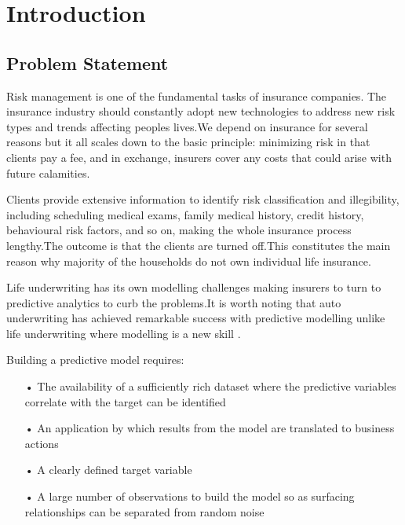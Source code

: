 \chapter{Introduction}

\section{Problem Statement}






Risk management is one of the fundamental tasks of insurance companies. The insurance industry should constantly adopt new technologies to address new risk types and trends affecting peoples lives.We depend on insurance for several reasons but it all scales down to the basic principle: minimizing risk in that clients pay a fee, and in exchange, insurers cover any costs that could arise with future calamities.

Clients provide extensive information to identify risk classification and illegibility, including scheduling medical exams, family medical history, credit history, behavioural risk factors, and so on, making the whole insurance process lengthy.The outcome is that the clients are turned off.This constitutes the main reason why majority of the households do not own individual life insurance.

Life underwriting has its own modelling challenges making insurers to turn to predictive  analytics to curb the problems.It is worth noting that auto underwriting has achieved remarkable success with predictive modelling unlike life underwriting where modelling is a new skill \citep{MikeBatty}. 

Building a predictive model requires:

\begin{enumerate}
\item[•] The availability of a sufficiently rich dataset where the predictive variables  correlate with the target can be identified

\item[•] An application by which results from the model are translated to business actions

\item[•] A clearly defined target variable

\item[•] A large number of observations to build the model so as surfacing relationships can be separated from random noise
\end{enumerate}

